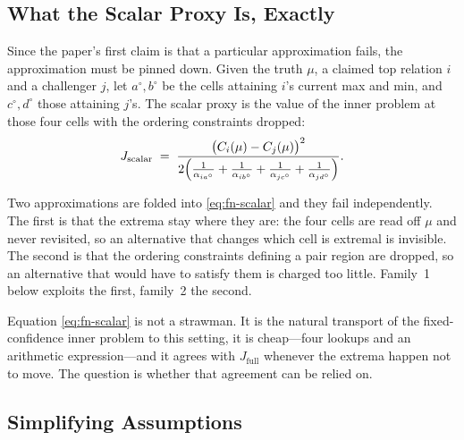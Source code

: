 \subsection{What the Scalar Proxy Is, Exactly}
\label{sec:fn-proxydef}

Since the paper's first claim is that a particular approximation fails, the approximation
must be pinned down. Given the truth $\mu$, a claimed top relation $i$ and a challenger $j$,
let $a^{\circ},b^{\circ}$ be the cells attaining $i$'s current max and min, and
$c^{\circ},d^{\circ}$ those attaining $j$'s. The scalar proxy is the value of the inner
problem at those four cells with the ordering constraints dropped:
\begin{equation}
J_{\mathrm{scalar}}
\;=\;
\frac{\bigl(C_{i}(\mu)-C_{j}(\mu)\bigr)^{2}}
     {2\Bigl(\frac{1}{\alpha_{ia^{\circ}}}+\frac{1}{\alpha_{ib^{\circ}}}
            +\frac{1}{\alpha_{jc^{\circ}}}+\frac{1}{\alpha_{jd^{\circ}}}\Bigr)} .
\label{eq:fn-scalar}
\end{equation}

Two approximations are folded into \eqref{eq:fn-scalar} and they fail independently. The first
is that the extrema stay where they are: the four cells are read off $\mu$ and never
revisited, so an alternative that changes which cell is extremal is invisible. The second is
that the ordering constraints defining a pair region are dropped, so an alternative that
would have to satisfy them is charged too little. Family~1 below exploits the first, family~2
the second.

Equation \eqref{eq:fn-scalar} is not a strawman. It is the natural transport of the
fixed-confidence inner problem to this setting, it is cheap---four lookups and an arithmetic
expression---and it agrees with $J_{\mathrm{full}}$ whenever the extrema happen not to move.
The question is whether that agreement can be relied on.

\subsection{Simplifying Assumptions}

